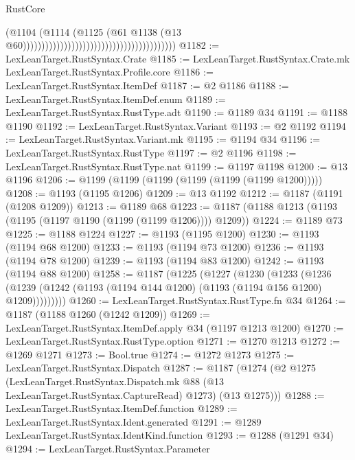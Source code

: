\begin{lexlean}{RustCore}
\begin{coremodule}
{\begin{coremodule}
{{{{{{{{{{{{{{{{{{{{{{{{{{{{{{{{{{{{{{{{{{{{                                                                            (@1104
                                                                              (@1114
                                                                                (@1125
                                                                                  (@61
                                                                                    @1138
                                                                                    (@13
                                                                                      @60)))))))))))))))))))))))))))))))))))))))))
@1182 := LexLeanTarget.RustSyntax.Crate
@1185 := LexLeanTarget.RustSyntax.Crate.mk LexLeanTarget.RustSyntax.Profile.core
@1186 := LexLeanTarget.RustSyntax.ItemDef
@1187 := @2 @1186
@1188 := LexLeanTarget.RustSyntax.ItemDef.enum
@1189 := LexLeanTarget.RustSyntax.RustType.adt
@1190 := @1189 @34
@1191 := @1188 @1190
@1192 := LexLeanTarget.RustSyntax.Variant
@1193 := @2 @1192
@1194 := LexLeanTarget.RustSyntax.Variant.mk
@1195 := @1194 @34
@1196 := LexLeanTarget.RustSyntax.RustType
@1197 := @2 @1196
@1198 := LexLeanTarget.RustSyntax.RustType.nat
@1199 := @1197 @1198
@1200 := @13 @1196
@1206 := @1199 (@1199 (@1199 (@1199 (@1199 (@1199 @1200)))))
@1208 := @1193 (@1195 @1206)
@1209 := @13 @1192
@1212 := @1187 (@1191 (@1208 @1209))
@1213 := @1189 @68
@1223 := @1187 (@1188 @1213 (@1193 (@1195 (@1197 @1190 (@1199 (@1199 @1206)))) @1209))
@1224 := @1189 @73
@1225 := @1188 @1224
@1227 := @1193 (@1195 @1200)
@1230 := @1193 (@1194 @68 @1200)
@1233 := @1193 (@1194 @73 @1200)
@1236 := @1193 (@1194 @78 @1200)
@1239 := @1193 (@1194 @83 @1200)
@1242 := @1193 (@1194 @88 @1200)
@1258 := @1187
    (@1225
      (@1227
        (@1230
          (@1233
            (@1236 (@1239 (@1242 (@1193 (@1194 @144 @1200) (@1193 (@1194 @156 @1200) @1209)))))))))
@1260 := LexLeanTarget.RustSyntax.RustType.fn @34
@1264 := @1187 (@1188 @1260 (@1242 @1209))
@1269 := LexLeanTarget.RustSyntax.ItemDef.apply @34 (@1197 @1213 @1200)
@1270 := LexLeanTarget.RustSyntax.RustType.option
@1271 := @1270 @1213
@1272 := @1269 @1271
@1273 := Bool.true
@1274 := @1272 @1273
@1275 := LexLeanTarget.RustSyntax.Dispatch
@1287 := @1187
    (@1274
      (@2
        @1275
        (LexLeanTarget.RustSyntax.Dispatch.mk @88 (@13 LexLeanTarget.RustSyntax.CaptureRead) @1273)
        (@13 @1275)))
@1288 := LexLeanTarget.RustSyntax.ItemDef.function
@1289 := LexLeanTarget.RustSyntax.Ident.generated
@1291 := @1289 LexLeanTarget.RustSyntax.IdentKind.function
@1293 := @1288 (@1291 @34)
@1294 := LexLeanTarget.RustSyntax.Parameter
}}}}}}}}}}}}}}}}}}}}}}}}}}}}}}}}}}}}}}}}}}}}
\end{coremodule}}
\end{coremodule}
\end{lexlean}
